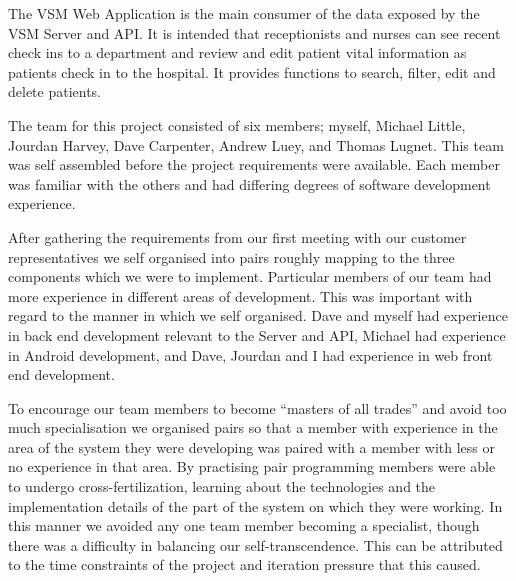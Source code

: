 \documentclass[conference]{IEEEtran}
\begin{document}
The VSM Web Application \cite{vsmsvr} is the main consumer of the data exposed
by the VSM Server and API. It is intended that receptionists and nurses can see
recent check ins to a department and review and edit patient vital information
as patients check in to the hospital. It provides functions to search, filter,
edit and delete patients.

The team for this project consisted of six members; myself, Michael Little,
Jourdan Harvey, Dave Carpenter, Andrew Luey, and Thomas Lugnet. This team was
self assembled before the project requirements were available. Each member was
familiar with the others and had differing degrees of software development
experience.



After gathering the requirements from our first meeting with our customer
representatives we self organised into pairs roughly mapping to the three
components which we were to implement. Particular members of our team had more
experience in different areas of development. This was important with regard to
the manner in which we self organised. Dave and myself had experience in back
end development relevant to the Server and API, Michael had experience in
Android development, and Dave, Jourdan and I had experience in web front end
development.

To encourage our team members to become ``masters of all trades'' and avoid too
much specialisation we organised pairs so that a member with experience in the
area of the system they were developing was paired with a member with less or no
experience in that area. By practising pair programming members were able to
undergo cross-fertilization, learning about the technologies and the
implementation details of the part of the system on which they were working. In
this manner we avoided any one team member becoming a specialist, though there
was a difficulty in balancing our self-transcendence. This can be attributed to
the time constraints of the project and iteration pressure that this caused.
\end{document}
